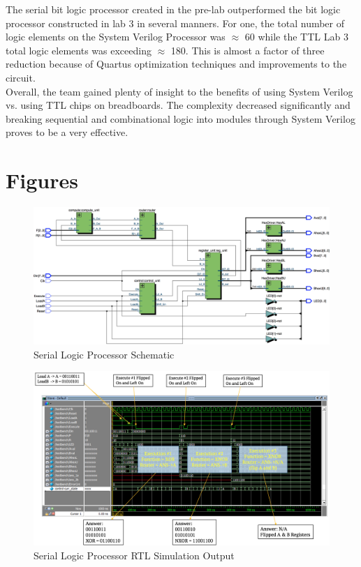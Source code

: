 \documentclass[journal, twocolumn, final,11pt,letterpaper]{IEEEtran}
\begin{document}
The serial bit logic processor created in the pre-lab outperformed the bit logic processor constructed in lab 3 in several manners. For one, the total number of logic elements on the System Verilog Processor was $\approx$ 60 while the TTL Lab 3 total logic elements was exceeding $\approx$  180. This is almost a factor of three reduction because of Quartus optimization techniques and improvements to the circuit.\\ 

Overall, the team gained plenty of insight to the benefits of using System Verilog vs. using TTL chips on breadboards. The complexity decreased significantly and breaking sequential and combinational logic into modules through System Verilog proves to be a very effective. 


\clearpage
\onecolumn
\section{Figures}

\begin{figure} [htbp]
	\centering
	\includegraphics[scale=0.35]{Schematic-Processor.png}
	\caption{Serial Logic Processor Schematic\label{fig:schematic-processor}}
\end{figure}

\begin{figure} [htbp]
	\centering
	\includegraphics[scale=0.55]{processor-output-rtl-simulator.png}
	\caption{Serial Logic Processor RTL Simulation Output\label{fig:processor-output-rtl-simulator}}
\end{figure}
\end{document}
